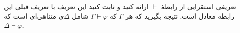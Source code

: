 تعریفی استقرایی از رابطهٔ $\vdash$ ارائه کنید و ثابت کنید این تعریف با تعریف قبلی این رابطه معادل است. نتیجه بگیرید که هر $\Gamma$ که $\Gamma\vdash\varphi$ شامل $\Delta$ی متناهی‌ای است که $\Delta\vdash\varphi$.